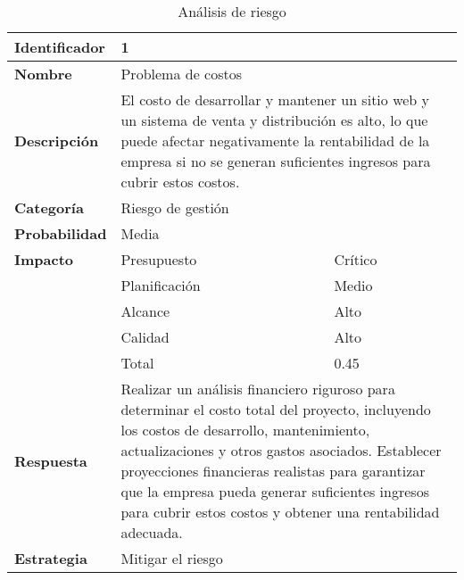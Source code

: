 \begin{table}[htb]
\centering
\begin{tabular}{| l | l | l |}
\hline
\textbf{Identificador} & \multicolumn{2}{l|}{1} \\
\hline
\textbf{Nombre} & \multicolumn{2}{l|}{Problema de costos} \\
\hline
\textbf{Descripción} & \multicolumn{2}{p{10cm}|}{El costo de desarrollar y mantener un sitio web y un sistema de venta y distribución es alto, lo que puede afectar negativamente la rentabilidad de la empresa si no se generan suficientes ingresos para cubrir estos costos.} \\
\hline
\textbf{Categoría} & \multicolumn{2}{l|}{Riesgo de gestión} \\
\hline
\textbf{Probabilidad} & \multicolumn{2}{l|}{Media} \\
\hline
\textbf{Impacto} & Presupuesto & Crítico \\
\cline{2-3}
& Planificación & Medio \\
\cline{2-3}
& Alcance & Alto \\
\cline{2-3}
& Calidad & Alto \\
\cline{2-3}
& Total & 0.45 \\
\hline
\textbf{Respuesta} & \multicolumn{2}{p{10cm}|}{Realizar un análisis financiero riguroso para determinar el costo total del proyecto, incluyendo los costos de desarrollo, mantenimiento, actualizaciones y otros gastos asociados. Establecer proyecciones financieras realistas para garantizar que la empresa pueda generar suficientes ingresos para cubrir estos costos y obtener una rentabilidad adecuada.} \\
\hline
\textbf{Estrategia} & \multicolumn{2}{l|}{Mitigar el riesgo} \\
\hline
\end{tabular}
\caption{Análisis de riesgo}
\label{table:risk_analysis}
\end{table}